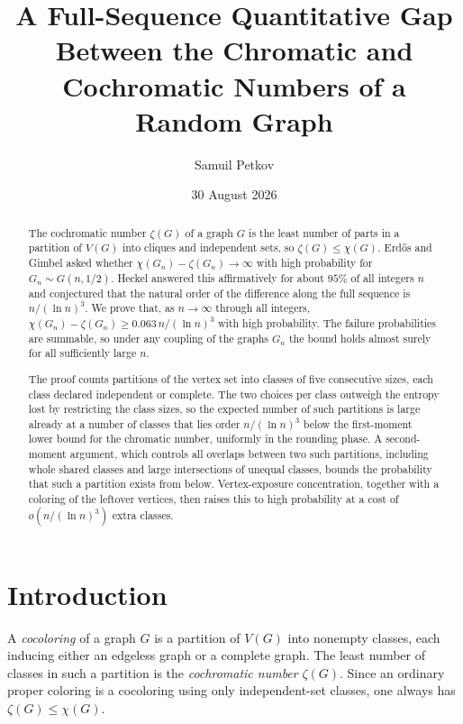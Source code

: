 \documentclass[a4paper,10pt,reqno]{amsart}
\title[Chromatic and cochromatic numbers]{A Full-Sequence Quantitative Gap
Between the Chromatic and Cochromatic Numbers of a Random Graph}
\author[Samuil Petkov]{Samuil Petkov}
\date{30 August 2026}
\numberwithin{equation}{section}
\theoremstyle{plain}
\theoremstyle{remark}
\begin{document}
\begin{abstract}
The cochromatic number \(\zeta(G)\) of a graph \(G\) is the least number of parts in a partition of \(V(G)\) into cliques and independent sets, so \(\zeta(G)\le\chi(G)\). Erd\H{o}s and Gimbel asked whether \(\chi(G_n)-\zeta(G_n)\to\infty\) with high probability for \(G_n\sim G(n,1/2)\). Heckel answered this affirmatively for about \(95\%\) of all integers \(n\) and conjectured that the natural order of the difference along the full sequence is \(n/(\ln n)^3\). We prove that, as \(n\to\infty\) through all integers, \(\chi(G_n)-\zeta(G_n)\ge0.063\,n/(\ln n)^3\) with high probability. The failure probabilities are summable, so under any coupling of the graphs \(G_n\) the bound holds almost surely for all sufficiently large \(n\).

The proof counts partitions of the vertex set into classes of five consecutive sizes, each class declared independent or complete. The two choices per class outweigh the entropy lost by restricting the class sizes, so the expected number of such partitions is large already at a number of classes that lies order \(n/(\ln n)^3\) below the first-moment lower bound for the chromatic number, uniformly in the rounding phase. A second-moment argument, which controls all overlaps between two such partitions, including whole shared classes and large intersections of unequal classes, bounds the probability that such a partition exists from below. Vertex-exposure concentration, together with a coloring of the leftover vertices, then raises this to high probability at a cost of \(o(n/(\ln n)^3)\) extra classes.
\end{abstract}

\maketitle

\section*{Introduction}
\label{sec:introduction}

A \emph{cocoloring} of a graph $G$ is a partition of $V(G)$ into nonempty
classes, each inducing either an edgeless graph or a complete graph. The least
number of classes in such a partition is the \emph{cochromatic number}
$\zeta(G)$. Since an ordinary proper coloring is a cocoloring using only
independent-set classes, one always has $\zeta(G)\le\chi(G)$.
\end{document}
